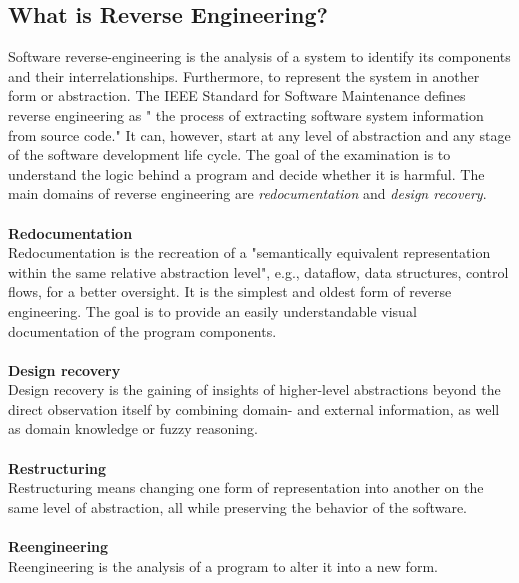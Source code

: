 \documentclass[seminar]{plai}
\begin{document}
\subsection{What is Reverse Engineering?}
\label{sec:reverse-engineering-background}
Software reverse-engineering is the analysis of a system to identify its components and their interrelationships. Furthermore, to represent the system in another form or abstraction.\cite{reverse-engineering-design-recovery-taxonomy}
The IEEE Standard for Software Maintenance defines reverse engineering as " the process of extracting software system information from source code."\cite{ieeeStandard-for-SW-maintenance}
It can, however, start at any level of abstraction and any stage of the software development life cycle. The goal of the examination is to understand the logic behind a program and decide whether it is harmful. The main domains of reverse engineering are \textit{redocumentation} and \textit{design recovery}.
\\\\
\textbf{Redocumentation}\\
Redocumentation is the recreation of a "semantically equivalent representation within the same relative abstraction level"\cite[p.15]{reverse-engineering-design-recovery-taxonomy}, e.g., dataflow, data structures, control flows, for a better oversight.
It is the simplest and oldest form of reverse engineering. The goal is to provide an easily understandable visual documentation of the program components.\cite{reverse-engineering-design-recovery-taxonomy}
\\\\
\textbf{Design recovery}\\
Design recovery is the gaining of insights of higher-level abstractions beyond the direct observation itself by combining domain- and external information, as well as domain knowledge or fuzzy reasoning.\cite{reverse-engineering-design-recovery-taxonomy}
\\\\
\textbf{Restructuring}\\
Restructuring means changing one form of representation into another on the same level of abstraction, all while preserving the behavior of the software.\cite{reverse-engineering-design-recovery-taxonomy}
\\\\
\textbf{Reengineering}\\
Reengineering is the analysis of a program to alter it into a new form.
\end{document}
